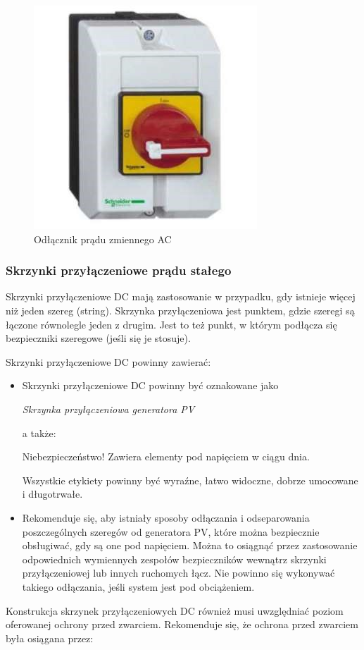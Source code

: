 \documentclass[12pt,a4paper]{article}
\begin{document}
\begin{figure}[H]
\centering
\caption{Odłącznik prądu zmiennego AC}
\includegraphics[natwidth=8.40cm,natheight=8.40cm]{media/image24.jpg}
\end{figure}
\subsubsection{Skrzynki przyłączeniowe prądu stałego }


Skrzynki przyłączeniowe DC mają zastosowanie w przypadku, gdy istnieje 
więcej niż jeden szereg (string). Skrzynka przyłączeniowa jest punktem, 
gdzie szeregi są łączone równolegle jeden z drugim. Jest to też punkt, w 
którym podłącza się bezpieczniki szeregowe (jeśli się je stosuje). 

Skrzynki przyłączeniowe DC powinny zawierać: 

\begin{itemize}
\item Skrzynki przyłączeniowe DC powinny być oznakowane jako
\begin{displayquote}
\textit{Skrzynka przyłączeniowa generatora PV}
\end{displayquote}
 a także: 
\begin{displayquote}
Niebezpieczeństwo! Zawiera elementy pod napięciem w ciągu dnia.
\end{displayquote}
 Wszystkie etykiety powinny być 
wyraźne, łatwo widoczne, dobrze umocowane i długotrwałe. 
\item Rekomenduje się, aby istniały sposoby odłączania i odseparowania 
poszczególnych szeregów od generatora PV, które można bezpiecznie 
obsługiwać, gdy są one pod napięciem. Można to osiągnąć przez 
zastosowanie odpowiednich wymiennych zespołów bezpieczników wewnątrz 
skrzynki przyłączeniowej lub innych ruchomych łącz. Nie powinno się 
wykonywać takiego odłączania, jeśli system jest pod obciążeniem. 
\end{itemize}
Konstrukcja skrzynek przyłączeniowych DC również musi uwzględniać poziom 
oferowanej ochrony przed zwarciem. Rekomenduje się, że ochrona przed 
zwarciem była osiągana przez: 
\end{document}

